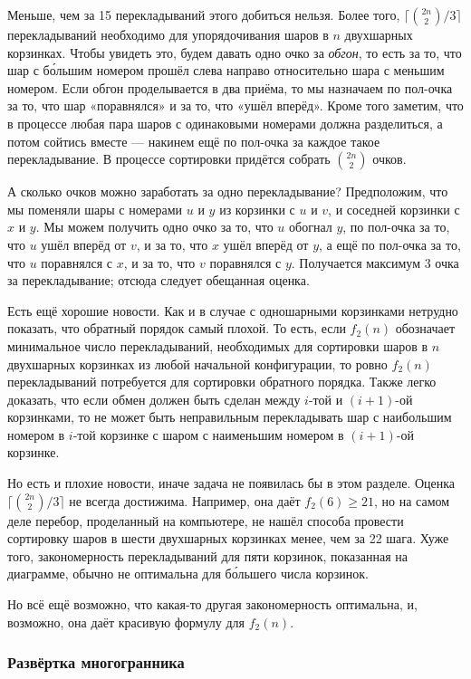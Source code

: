 Меньше, чем за 15 перекладываний этого добиться нельзя.
Более того, $\lceil\binom{2n}{2}/3\rceil$ перекладываний необходимо для упорядочивания шаров в $n$ двухшарных корзинках.
Чтобы увидеть это, будем давать одно очко за \emph{обгон}, то есть за то, что шар с б\'{о}льшим номером прошёл слева направо относительно шара с меньшим номером.
Если обгон проделывается в два приёма, то мы назначаем по пол-очка за то, что шар «поравнялся» и за то, что «ушёл вперёд».
Кроме того заметим, что в процессе любая пара шаров с одинаковыми номерами должна разделиться, а потом сойтись вместе --- накинем ещё по пол-очка за каждое такое перекладывание. 
В процессе сортировки придётся собрать $\binom{2n}2$ очков.

А сколько очков можно заработать за одно перекладывание?
Предположим, что мы поменяли шары с номерами $u$ и $y$ из корзинки с $u$ и $v$, и соседней корзинки с $x$ и $y$.
Мы можем получить одно очко за то, что $u$ обогнал $y$,
по пол-очка за то, что $u$ ушёл вперёд от $v$,
и за то, что $x$ ушёл вперёд от $y$,
а ещё по пол-очка за то, что $u$ поравнялся с $x$, 
и за то, что $v$ поравнялся с $y$.
Получается максимум 3 очка за перекладывание;
отсюда следует обещанная оценка.


Есть ещё хорошие новости.
Как и в случае с одношарными корзинками нетрудно показать, что обратный порядок самый плохой.
То есть, если $f_2(n)$ обозначает минимальное число перекладываний, необходимых для сортировки шаров в $n$ двухшарных корзинках из любой начальной конфигурации, то ровно $f_2(n)$ перекладываний потребуется для сортировки обратного порядка.
Также легко доказать, что если обмен должен быть сделан между $i$-той и $(i+1)$-ой корзинками, то не может быть неправильным перекладывать шар с наибольшим номером в $i$-той корзинке с шаром с наименьшим номером в $(i+1)$-ой корзинке.

Но есть и плохие новости, иначе задача не появилась бы в этом разделе.
Оценка $\lceil\binom{2n}{2}/3\rceil$ не всегда достижима.
Например, она даёт $f_2(6)\ge 21$, но на самом деле перебор, проделанный на компьютере, не нашёл способа провести сортировку шаров в шести двухшарных корзинках менее, чем за 22 шага.
Хуже того, закономерность перекладываний для пяти корзинок, показанная на диаграмме, обычно не оптимальна для б\'{о}льшего числа корзинок.

Но всё ещё возможно, что какая-то другая закономерность оптимальна, и, возможно, она даёт красивую формулу для $f_2(n)$.

\subsubsection*{Развёртка многогранника}

